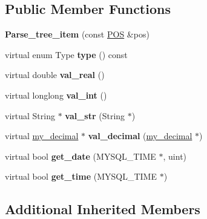 \subsection*{Public Member Functions}
\begin{DoxyCompactItemize}
\item 
\mbox{\label{classParse__tree__item_a0af43b6c94d651e909b56aad92467202}} 
{\bfseries Parse\+\_\+tree\+\_\+item} (const \mbox{\hyperlink{structYYLTYPE}{P\+OS}} \&pos)
\item 
\mbox{\label{classParse__tree__item_a63f3bc004c75d6dc220730cd8219c268}} 
virtual enum Type {\bfseries type} () const
\item 
\mbox{\label{classParse__tree__item_aaf38f93d9f4c1472f60afa39eaba17b2}} 
virtual double {\bfseries val\+\_\+real} ()
\item 
\mbox{\label{classParse__tree__item_acc428d847f7f390b966d167544ced742}} 
virtual longlong {\bfseries val\+\_\+int} ()
\item 
\mbox{\label{classParse__tree__item_ac3990d56081709844706a18d53058c18}} 
virtual String $\ast$ {\bfseries val\+\_\+str} (String $\ast$)
\item 
\mbox{\label{classParse__tree__item_ad3978b085e6cb8b35cc8d682f752d080}} 
virtual \mbox{\hyperlink{classmy__decimal}{my\+\_\+decimal}} $\ast$ {\bfseries val\+\_\+decimal} (\mbox{\hyperlink{classmy__decimal}{my\+\_\+decimal}} $\ast$)
\item 
\mbox{\label{classParse__tree__item_a5f2167862dd9786d519494fa4d57bf1d}} 
virtual bool {\bfseries get\+\_\+date} (M\+Y\+S\+Q\+L\+\_\+\+T\+I\+ME $\ast$, uint)
\item 
\mbox{\label{classParse__tree__item_a2480caf958e38250638dacef485a8cf3}} 
virtual bool {\bfseries get\+\_\+time} (M\+Y\+S\+Q\+L\+\_\+\+T\+I\+ME $\ast$)
\end{DoxyCompactItemize}
\subsection*{Additional Inherited Members}


